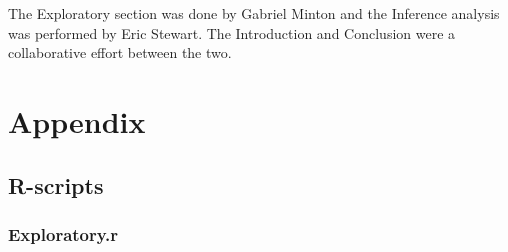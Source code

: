 \documentclass{article}
\begin{document}
The Exploratory section was done by Gabriel Minton and the Inference analysis was performed by Eric Stewart. The Introduction and Conclusion were a collaborative effort between the two.

\newpage
\section{Appendix}

\subsection{R-scripts}
\subsubsection{Exploratory.r}
\end{document}
